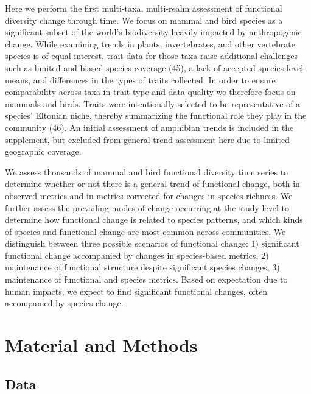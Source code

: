 \documentclass{article}
\begin{document}
Here we perform the first multi-taxa, multi-realm assessment of
functional diversity change through time. We focus on mammal and bird
species as a significant subset of the world's biodiversity heavily
impacted by anthropogenic change. While examining trends in plants,
invertebrates, and other vertebrate species is of equal interest, trait
data for those taxa raise additional challenges such as limited and
biased species coverage (45), a lack of accepted species-level means,
and differences in the types of traits collected. In order to ensure
comparability across taxa in trait type and data quality we therefore
focus on mammals and birds. Traits were intentionally selected to be
representative of a species' Eltonian niche, thereby summarizing the
functional role they play in the community (46). An initial assessment
of amphibian trends is included in the supplement, but excluded from
general trend assessment here due to limited geographic coverage.

We assess thousands of mammal and bird functional diversity time series
to determine whether or not there is a general trend of functional
change, both in observed metrics and in metrics corrected for changes in
species richness. We further assess the prevailing modes of change
occurring at the study level to determine how functional change is
related to species patterns, and which kinds of species and functional
change are most common across communities. We distinguish between three
possible scenarios of functional change: 1) significant functional
change accompanied by changes in species-based metrics, 2) maintenance
of functional structure despite significant species changes, 3)
maintenance of functional and species metrics. Based on expectation due
to human impacts, we expect to find significant functional changes,
often accompanied by species change.

\hypertarget{material-and-methods}{%
\section{Material and Methods}\label{material-and-methods}}

\hypertarget{data}{%
\subsection{Data}\label{data}}
\end{document}
